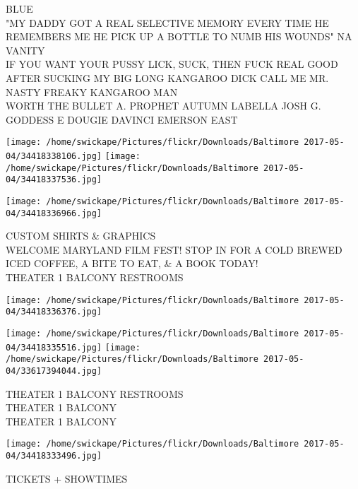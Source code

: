 \documentclass[10pt,letterpaper]{article}
\begin{document}
BLUE\\
"MY DADDY GOT A REAL SELECTIVE MEMORY EVERY TIME HE REMEMBERS ME HE PICK UP A BOTTLE TO NUMB HIS WOUNDS" NA VANITY\\
IF YOU WANT YOUR PUSSY LICK, SUCK, THEN FUCK REAL GOOD AFTER SUCKING MY BIG LONG KANGAROO DICK CALL ME MR. NASTY FREAKY KANGAROO MAN\\
WORTH THE BULLET A. PROPHET AUTUMN LABELLA JOSH G. GODDESS E DOUGIE DAVINCI EMERSON EAST
\pagebreak

\texttt{[image: /home/swickape/Pictures/flickr/Downloads/Baltimore 2017-05-04/34418338106.jpg]}
\texttt{[image: /home/swickape/Pictures/flickr/Downloads/Baltimore 2017-05-04/34418337536.jpg]}

\vspace{0.25in}
\texttt{[image: /home/swickape/Pictures/flickr/Downloads/Baltimore 2017-05-04/34418336966.jpg]}

CUSTOM SHIRTS \& GRAPHICS\\
WELCOME MARYLAND FILM FEST!  STOP IN FOR A COLD BREWED ICED COFFEE, A BITE TO EAT, \& A BOOK TODAY!\\
THEATER 1 BALCONY RESTROOMS
\pagebreak

\texttt{[image: /home/swickape/Pictures/flickr/Downloads/Baltimore 2017-05-04/34418336376.jpg]}

\vspace{0.25in}
\texttt{[image: /home/swickape/Pictures/flickr/Downloads/Baltimore 2017-05-04/34418335516.jpg]}
\texttt{[image: /home/swickape/Pictures/flickr/Downloads/Baltimore 2017-05-04/33617394044.jpg]}

THEATER 1 BALCONY RESTROOMS\\
THEATER 1 BALCONY\\
THEATER 1 BALCONY
\pagebreak

\texttt{[image: /home/swickape/Pictures/flickr/Downloads/Baltimore 2017-05-04/34418333496.jpg]}

TICKETS + SHOWTIMES
\pagebreak
\end{document}
